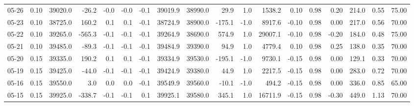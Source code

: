 \begin{threeparttable}
{\begin{tabular}{lrrrrrrrrrrrrrrrrr}
  05-26 &     0.10 & 39020.0 &             -26.2 &              -0.0 &               -0.0 &               -0.1 & 39019.9 & 38990.0 &       29.9 &                      1.0 &              1538.2 &       0.10 &      0.98 &           0.20 &            214.0 &            0.55 &                  75.00 \\
  05-23 &     0.10 & 38725.0 &             160.2 &               0.1 &                0.1 &               -0.1 & 38724.9 & 38900.0 &     -175.1 &                     -1.0 &              8917.6 &      -0.10 &      0.98 &           0.00 &            217.0 &            0.56 &                  70.00 \\
  05-22 &     0.10 & 39265.0 &            -565.3 &              -0.1 &               -0.1 &               -0.1 & 39264.9 & 38690.0 &      574.9 &                      1.0 &             29007.1 &      -0.10 &      0.98 &          -0.20 &            184.0 &            0.48 &                  75.00 \\
  05-21 &     0.10 & 39485.0 &             -89.3 &              -0.1 &               -0.1 &               -0.1 & 39484.9 & 39390.0 &       94.9 &                      1.0 &              4779.4 &       0.10 &      0.98 &           0.25 &            138.0 &            0.35 &                  70.00 \\
  05-20 &     0.15 & 39335.0 &             190.2 &               0.1 &                0.1 &               -0.1 & 39334.9 & 39530.0 &     -195.1 &                     -1.0 &              9730.1 &      -0.15 &      0.98 &           0.00 &            129.1 &            0.33 &                  70.00 \\
  05-19 &     0.15 & 39425.0 &             -44.0 &              -0.1 &               -0.1 &               -0.1 & 39424.9 & 39380.0 &       44.9 &                      1.0 &              2217.5 &      -0.15 &      0.98 &           0.00 &            283.0 &            0.72 &                  70.00 \\
  05-16 &     0.15 & 39550.0 &               3.0 &               0.0 &                0.0 &               -0.1 & 39549.9 & 39560.0 &      -10.1 &                     -1.0 &               494.2 &      -0.15 &      0.98 &           0.00 &            336.0 &            0.85 &                  65.00 \\
  05-15 &     0.15 & 39925.0 &            -338.7 &              -0.1 &               -0.1 &                0.1 & 39925.1 & 39580.0 &      345.1 &                      1.0 &             16711.9 &      -0.15 &      0.98 &          -0.30 &            449.0 &            1.13 &                  70.00 \\

\end{tabular}}
\end{threeparttable}

